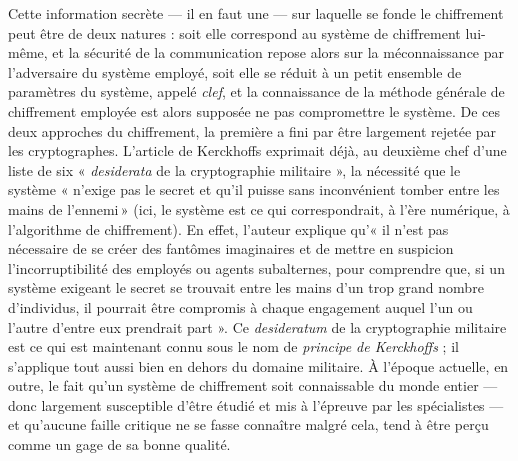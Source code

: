 

Cette information secrète --- il en faut une --- sur laquelle se fonde le chiffrement peut être de deux natures : soit elle
correspond au système de chiffrement lui-même, et la sécurité de la communication repose alors
sur la méconnaissance par l’adversaire du système employé, soit elle se réduit à un petit ensemble de
paramètres du système, appelé \emph{clef}, et la connaissance de la méthode générale de chiffrement
employée est alors supposée ne pas compromettre le système.
De ces deux approches du chiffrement, la première a fini par être largement rejetée par les
cryptographes.
L’article de Kerckhoffs exprimait déjà, au deuxième chef d’une liste de six « \emph{desiderata} de
la cryptographie militaire », la nécessité que le système « n’exige pas le secret et qu’il puisse
sans inconvénient tomber entre les mains de l’ennemi » (ici, le système est ce qui correspondrait, à
l’ère numérique, à l'algorithme de chiffrement).
En effet, l’auteur explique qu’« il n’est pas nécessaire de se créer des fantômes imaginaires et de mettre
en suspicion l’incorruptibilité des employés ou agents subalternes, pour comprendre que, si un
système exigeant le secret se trouvait entre les mains d’un trop grand nombre d’individus, il
pourrait être compromis à chaque engagement auquel l’un ou l’autre d’entre eux prendrait part ».
Ce \emph{desideratum} de la cryptographie militaire est ce qui est maintenant connu sous le nom de
\emph{principe de Kerckhoffs} ; il s’applique tout aussi bien en dehors du domaine militaire.
À l’époque actuelle, en outre, le fait qu’un système de
chiffrement soit connaissable du monde entier --- donc largement susceptible d’être étudié et mis à
l’épreuve par les spécialistes --- et qu’aucune faille critique ne se fasse connaître malgré cela, tend
à être perçu comme un gage de sa bonne qualité.

